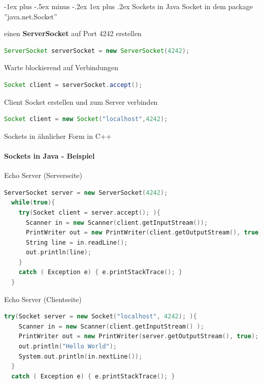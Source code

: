 \documentclass[10pt]{article}
\makeatletter
\renewcommand{\subsubsection}{\@startsection{subsubsection}{3}{0mm}%
                                {-1ex plus -.5ex minus -.2ex}%
                                {1ex plus .2ex}%
                                {\normalfont\small\bfseries}}
\makeatother
\begin{document}
  \subsubsection{Sockets in Java}
  Socket in dem package ''java.net.Socket''
  \begin{itemize*}
    \item einen \textbf{ServerSocket} auf Port 4242 erstellen 
    \begin{lstlisting}[language=java]
      ServerSocket serverSocket = new ServerSocket(4242); 
    \end{lstlisting}
    \item Warte \color{orange}blockierend \color{black} auf Verbindungen
    \begin{lstlisting}[language=java]
      Socket client = serverSocket.accept(); 
    \end{lstlisting}
    \item Client Socket erstellen und zum Server verbinden
    \begin{lstlisting}[language=java]
      Socket client = new Socket("localhost",4242); 
    \end{lstlisting}
    \item Sockets in ähnlicher Form in C++
  \end{itemize*}
  
  \paragraph{Sockets in Java - Beispiel}
  
  Echo Server (Serverseite)
  \begin{lstlisting}[language=C++]
  ServerSocket server = new ServerSocket(4242);
  while(true){
    try(Socket client = server.accept(); ){
      Scanner in = new Scanner(client.getInputStream());
      PrintWriter out = new PrintWriter(client.getOutputStream(), true);
      String line = in.readLine();
      out.println(line);
    }
    catch ( Exception e) { e.printStackTrace(); }
  }
\end{lstlisting}
  
  Echo Server (Clientseite)
  \begin{lstlisting}[language=C++]
  try(Socket server = new Socket("localhost", 4242); ){
    Scanner in = new Scanner(client.getInputStream() );
    PrintWriter out = new PrintWriter(server.getOutputStream(), true);
    out.println("Hello World");
    System.out.println(in.nextLine());
  }
  catch ( Exception e) { e.printStackTrace(); }
  \end{lstlisting}
  
\end{document}
